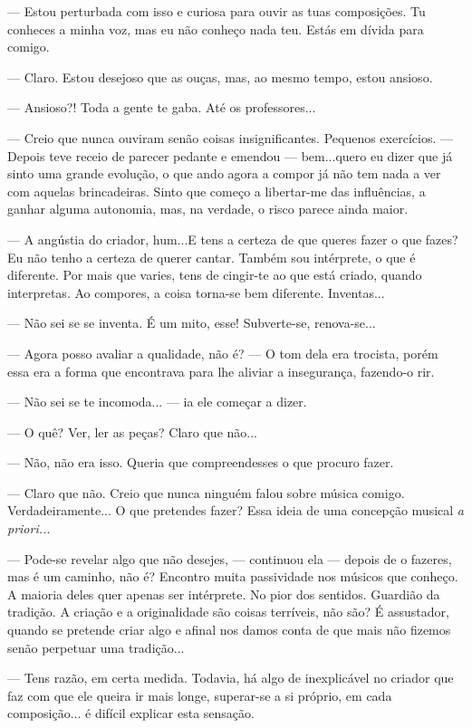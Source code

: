--- Estou perturbada com isso e curiosa para ouvir as tuas composições. Tu
conheces a minha voz, mas eu não conheço nada teu. Estás em dívida para
comigo.

--- Claro. Estou desejoso que as ouças, mas, ao mesmo tempo, estou
ansioso.

--- Ansioso?! Toda a gente te gaba. Até os professores...

--- Creio que nunca ouviram senão coisas insignificantes. Pequenos
exercícios. --- Depois teve receio de parecer pedante e emendou ---
bem...quero eu dizer que já sinto uma grande evolução, o que ando agora
a compor já não tem nada a ver com aquelas brincadeiras. Sinto que
começo a libertar-me das influências, a ganhar alguma autonomia, mas, na
verdade, o risco parece ainda maior.

--- A angústia do criador, hum...E tens a certeza de que queres fazer o
que fazes? Eu não tenho a certeza de querer cantar. Também sou
intérprete, o que é diferente. Por mais que varies, tens de cingir-te ao
que está criado, quando interpretas. Ao compores, a coisa torna-se bem
diferente. Inventas...

--- Não sei se se inventa. É um mito, esse! Subverte-se, renova-se...

--- Agora posso avaliar a qualidade, não é? --- O tom dela era trocista,
porém essa era a forma que encontrava para lhe aliviar a insegurança,
fazendo-o rir.

--- Não sei se te incomoda... --- ia ele começar a dizer.

--- O quê? Ver, ler as peças? Claro que não...

--- Não, não era isso. Queria que compreendesses o que procuro fazer.

--- Claro que não. Creio que nunca ninguém falou sobre música comigo.
Verdadeiramente... O que pretendes fazer? Essa ideia de uma concepção
musical \emph{a priori...}

--- Pode-se revelar algo que não desejes, --- continuou ela --- depois
de o fazeres, mas é um caminho, não é? Encontro muita passividade nos
músicos que conheço. A maioria deles quer apenas ser intérprete. No pior
dos sentidos. Guardião da tradição. A criação e a originalidade são
coisas terríveis, não são? É assustador, quando se pretende criar algo e
afinal nos damos conta de que mais não fizemos senão perpetuar uma
tradição...

--- Tens razão, em certa medida. Todavia, há algo de inexplicável no
criador que faz com que ele queira ir mais longe, superar-se a si
próprio, em cada composição... é difícil explicar esta sensação.

